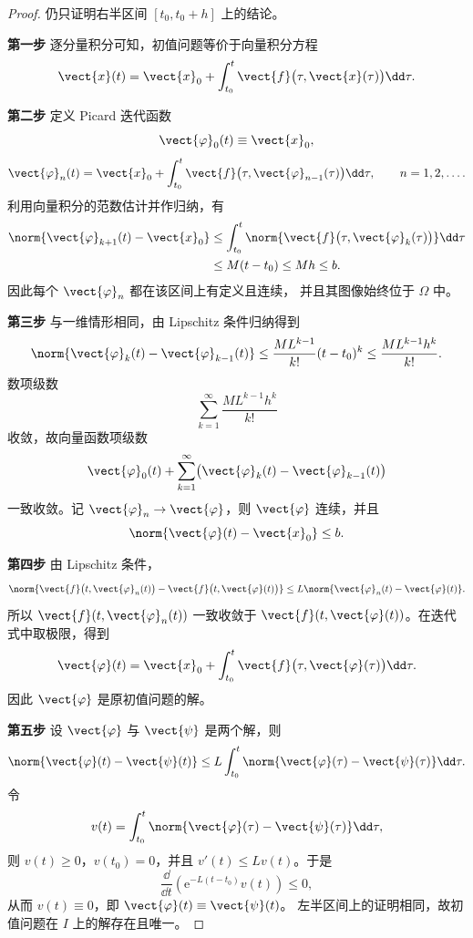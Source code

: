 \begin{proof}
	仍只证明右半区间 $[t_0,t_0+h]$ 上的结论。

	\noindent\textbf{第一步}\quad
	逐分量积分可知，初值问题等价于向量积分方程
	\[
		\vect{x}(t)
		=\vect{x}_0
		+\int_{t_0}^{t}
		\vect{f}\bigl(\tau,\vect{x}(\tau)\bigr)\dd\tau.
	\]

	\noindent\textbf{第二步}\quad
	定义 Picard 迭代函数
	\[
		\vect{\varphi}_0(t)\equiv\vect{x}_0,
	\]
	\[
		\vect{\varphi}_n(t)
		=\vect{x}_0
		+\int_{t_0}^{t}
		\vect{f}\bigl(\tau,\vect{\varphi}_{n-1}(\tau)\bigr)\dd\tau,
		\qquad n=1,2,\ldots.
	\]
	利用向量积分的范数估计并作归纳，有
	\[
		\begin{aligned}
			\norm{\vect{\varphi}_{k+1}(t)-\vect{x}_0}
			&\leq
			\int_{t_0}^{t}
			\norm{
				\vect{f}\bigl(\tau,\vect{\varphi}_k(\tau)\bigr)
			}\dd\tau\\
			&\leq M(t-t_0)
			\leq Mh
			\leq b.
		\end{aligned}
	\]
	因此每个 $\vect{\varphi}_n$ 都在该区间上有定义且连续，
	并且其图像始终位于 $\Omega$ 中。

	\noindent\textbf{第三步}\quad
	与一维情形相同，由 Lipschitz 条件归纳得到
	\[
		\norm{
			\vect{\varphi}_k(t)-\vect{\varphi}_{k-1}(t)
		}
		\leq
		\dfrac{ML^{k-1}}{k!}(t-t_0)^k
		\leq
		\dfrac{ML^{k-1}h^k}{k!}.
	\]
	数项级数
	\[
		\sum_{k=1}^{\infty}
		\dfrac{ML^{k-1}h^k}{k!}
	\]
	收敛，故向量函数项级数
	\[
		\vect{\varphi}_0(t)
		+\sum_{k=1}^{\infty}
		\bigl(
			\vect{\varphi}_k(t)-\vect{\varphi}_{k-1}(t)
		\bigr)
	\]
	一致收敛。记 $\vect{\varphi}_n\to\vect{\varphi}$，则
	$\vect{\varphi}$ 连续，并且
	\[
		\norm{\vect{\varphi}(t)-\vect{x}_0}\leq b.
	\]

	\noindent\textbf{第四步}\quad
	由 Lipschitz 条件，
	\[
		\norm{
			\vect{f}\bigl(t,\vect{\varphi}_n(t)\bigr)
			-\vect{f}\bigl(t,\vect{\varphi}(t)\bigr)
		}
		\leq
		L\norm{\vect{\varphi}_n(t)-\vect{\varphi}(t)}.
	\]
	所以
	$\vect{f}(t,\vect{\varphi}_n(t))$
	一致收敛于
	$\vect{f}(t,\vect{\varphi}(t))$。在迭代式中取极限，得到
	\[
		\vect{\varphi}(t)
		=\vect{x}_0
		+\int_{t_0}^{t}
		\vect{f}\bigl(\tau,\vect{\varphi}(\tau)\bigr)\dd\tau.
	\]
	因此 $\vect{\varphi}$ 是原初值问题的解。

	\noindent\textbf{第五步}\quad
	设 $\vect{\varphi}$ 与 $\vect{\psi}$ 是两个解，则
	\[
		\norm{\vect{\varphi}(t)-\vect{\psi}(t)}
		\leq
		L\int_{t_0}^{t}
		\norm{\vect{\varphi}(\tau)-\vect{\psi}(\tau)}\dd\tau.
	\]
	令
	\[
		v(t)=
		\int_{t_0}^{t}
		\norm{\vect{\varphi}(\tau)-\vect{\psi}(\tau)}\dd\tau,
	\]
	则 $v(t)\geq0$，$v(t_0)=0$，并且 $v'(t)\leq Lv(t)$。于是
	\[
		\dfrac{\dd}{\dd t}
		\left(\mathrm{e}^{-L(t-t_0)}v(t)\right)\leq0,
	\]
	从而 $v(t)\equiv0$，即
	$\vect{\varphi}(t)\equiv\vect{\psi}(t)$。
	左半区间上的证明相同，故初值问题在 $I$ 上的解存在且唯一。
\end{proof}


